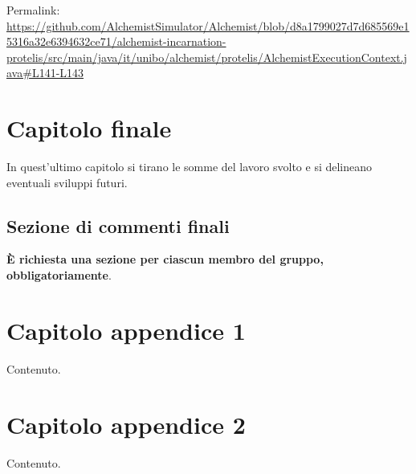 \documentclass[a4paper,12pt]{report}
\begin{document}
Permalink: \url{https://github.com/AlchemistSimulator/Alchemist/blob/d8a1799027d7d685569e15316a32e6394632ce71/alchemist-incarnation-protelis/src/main/java/it/unibo/alchemist/protelis/AlchemistExecutionContext.java#L141-L143}

\chapter{Capitolo finale}

In quest'ultimo capitolo si tirano le somme del lavoro svolto e si delineano eventuali sviluppi
futuri.

\section{Sezione di commenti finali}

\textbf{È richiesta una sezione per ciascun membro del gruppo, obbligatoriamente}.

\appendix
\chapter{Capitolo appendice 1}

Contenuto.

\chapter{Capitolo appendice 2}

Contenuto.



\end{document}
